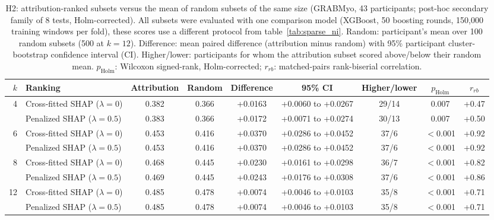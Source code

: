 \begin{table}[htbp]
\centering
\small
\caption{H2: attribution-ranked subsets versus the mean of random subsets of the same size (GRABMyo, 43 participants; post-hoc secondary family of 8 tests, Holm-corrected). All subsets were evaluated with one comparison model (XGBoost, 50 boosting rounds, 150,000 training windows per fold), these scores use a different protocol from table~\ref{tab:sparse_ni}. Random: participant's mean over 100 random subsets (500 at $k = 12$). Difference: mean paired difference (attribution minus random) with 95\% participant cluster-bootstrap confidence interval (CI). Higher/lower: participants for whom the attribution subset scored above/below their random mean. $p_{\mathrm{Holm}}$: Wilcoxon signed-rank, Holm-corrected; $r_{rb}$: matched-pairs rank-biserial correlation.}
\label{tab:h2}
\setlength{\tabcolsep}{4pt}
\begin{adjustbox}{max width=\textwidth}
\begin{tabular}{rlccccccc}
\toprule
$k$ & Ranking & Attribution & Random & Difference & 95\% CI & Higher/lower & $p_{\mathrm{Holm}}$ & $r_{rb}$ \\
\midrule
4 & Cross-fitted SHAP ($\lambda = 0$) & 0.382 & 0.366 & +0.0163 & +0.0060 to +0.0267 & 29/14 & 0.007 & +0.47 \\
 & Penalized SHAP ($\lambda = 0.5$) & 0.383 & 0.366 & +0.0172 & +0.0071 to +0.0274 & 30/13 & 0.007 & +0.50 \\
\midrule 6 & Cross-fitted SHAP ($\lambda = 0$) & 0.453 & 0.416 & +0.0370 & +0.0286 to +0.0452 & 37/6 & $<$0.001 & +0.92 \\
 & Penalized SHAP ($\lambda = 0.5$) & 0.453 & 0.416 & +0.0370 & +0.0286 to +0.0452 & 37/6 & $<$0.001 & +0.92 \\
\midrule 8 & Cross-fitted SHAP ($\lambda = 0$) & 0.468 & 0.445 & +0.0230 & +0.0161 to +0.0298 & 36/7 & $<$0.001 & +0.82 \\
 & Penalized SHAP ($\lambda = 0.5$) & 0.469 & 0.445 & +0.0243 & +0.0176 to +0.0308 & 37/6 & $<$0.001 & +0.86 \\
\midrule 12 & Cross-fitted SHAP ($\lambda = 0$) & 0.485 & 0.478 & +0.0074 & +0.0046 to +0.0103 & 35/8 & $<$0.001 & +0.71 \\
 & Penalized SHAP ($\lambda = 0.5$) & 0.485 & 0.478 & +0.0074 & +0.0046 to +0.0103 & 35/8 & $<$0.001 & +0.71 \\
\bottomrule
\end{tabular}
\end{adjustbox}
\end{table}

